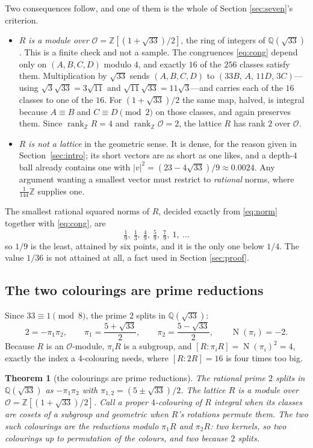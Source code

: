 \documentclass[11pt,reqno]{amsart}
\theoremstyle{plain}
\newtheorem{theorem}{Theorem}
\theoremstyle{definition}
\newcommand{\Z}{\mathbb{Z}}
\newcommand{\Q}{\mathbb{Q}}
\newcommand{\Lat}{R}
\newcommand{\Ok}{\mathcal{O}}
\DeclareMathOperator{\Nm}{N}
\DeclareMathOperator{\rank}{rank}
\begin{document}
Two consequences follow, and one of them is the whole of Section
\ref{sec:seven}'s criterion.
\begin{itemize}
  \item $\Lat$ \emph{is a module over} $\Ok = \Z[(1+\sqrt{33})/2]$, the ring of
  integers of $\Q(\sqrt{33})$. This is a finite check and not a sample. The
  congruences \eqref{eq:cong} depend only on $(A,B,C,D)$ modulo $4$, and exactly
  $16$ of the $256$ classes satisfy them. Multiplication by $\sqrt{33}$ sends
  $(A,B,C,D)$ to $(33B,\,A,\,11D,\,3C)$---using $\sqrt3\sqrt{33} = 3\sqrt{11}$
  and $\sqrt{11}\sqrt{33} = 11\sqrt3$---and carries each of the $16$ classes to
  one of the $16$. For $(1+\sqrt{33})/2$ the same map, halved, is integral
  because $A \equiv B$ and $C \equiv D \pmod 2$ on those classes, and again
  preserves them. Since $\rank_\Z \Lat = 4$ and $\rank_\Z \Ok = 2$, the lattice
  $\Lat$ has rank $2$ over $\Ok$.
  \item $\Lat$ \emph{is not a lattice} in the geometric sense. It is dense, for
  the reason given in Section~\ref{sec:intro}; its short vectors are as short as one likes, and a
  depth-$4$ ball already contains one with
  $\lvert v \rvert^2 = (23 - 4\sqrt{33})/9 \approx 0.0024$. Any argument wanting a
  smallest vector must restrict to \emph{rational} norms, where
  $\tfrac1{144}\Z$ supplies one.
\end{itemize}

The smallest rational squared norms of $\Lat$, decided exactly from \eqref{eq:norm}
together with \eqref{eq:cong}, are
\[
  \tfrac19,\ \tfrac13,\ \tfrac49,\ \tfrac59,\ \tfrac79,\ 1,\ \dots
\]
so $1/9$ is the least, attained by six points, and it is the only one below
$1/4$. The value $1/36$ is not attained at all, a fact used in Section
\ref{sec:proof}.

\subsection{The two colourings are prime reductions}
Since $33 \equiv 1 \pmod 8$, the prime $2$ splits in $\Q(\sqrt{33})$:
\[
  2 = -\pi_1\pi_2,
  \qquad
  \pi_1 = \frac{5+\sqrt{33}}{2},
  \qquad
  \pi_2 = \frac{5-\sqrt{33}}{2},
  \qquad
  \Nm(\pi_i) = -2 .
\]
Because $\Lat$ is an $\Ok$-module, $\pi_i\Lat$ is a subgroup, and
$[\Lat : \pi_i \Lat] = \Nm(\pi_i)^2 = 4$, exactly the index a $4$-colouring needs,
where $[\Lat : 2\Lat] = 16$ is four times too big.

\begin{theorem}[the colourings are prime reductions]\label{thm:primes}
The rational prime $2$ splits in $\Q(\sqrt{33})$ as $-\pi_1\pi_2$ with
$\pi_{1,2} = (5 \pm \sqrt{33})/2$. The lattice $\Lat$ is a module over
$\Ok = \Z[(1+\sqrt{33})/2]$. Call a proper $4$-colouring of $\Lat$
\emph{integral} when its classes are cosets of a subgroup and \emph{geometric}
when $\Lat$'s rotations permute them. The two such colourings are the reductions
modulo $\pi_1\Lat$ and $\pi_2\Lat$: two kernels, so two colourings up to
permutation of the colours, and two because $2$ splits.
\end{theorem}
\end{document}
